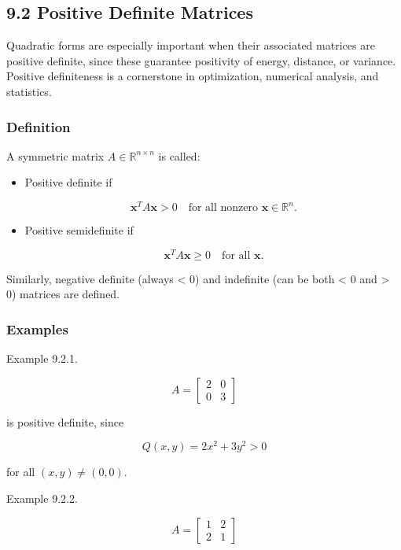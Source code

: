 \documentclass[
  12pt,
  a4paper,
]{article}
\begin{document}
\subsection{9.2 Positive Definite
Matrices}\label{92-positive-definite-matrices}

Quadratic forms are especially important when their associated matrices
are positive definite, since these guarantee positivity of energy,
distance, or variance. Positive definiteness is a cornerstone in
optimization, numerical analysis, and statistics.

\subsubsection{Definition}\label{definition-9}

A symmetric matrix \(A \in \mathbb{R}^{n \times n}\) is called:

\begin{itemize}
\item
  Positive definite if

  \[\mathbf{x}^T A \mathbf{x} > 0 \quad \text{for all nonzero } \mathbf{x} \in \mathbb{R}^n.\]
\item
  Positive semidefinite if

  \[\mathbf{x}^T A \mathbf{x} \geq 0 \quad \text{for all } \mathbf{x}.\]
\end{itemize}

Similarly, negative definite (always \textless{} 0) and indefinite (can
be both \textless{} 0 and \textgreater{} 0) matrices are defined.

\subsubsection{Examples}\label{examples-10}

Example 9.2.1.

\[A = \begin{bmatrix} 2 & 0 \\ 0 & 3 \end{bmatrix}\]

is positive definite, since

\[Q(x,y) = 2x^2 + 3y^2 > 0\]

for all \((x,y) \neq (0,0)\).

Example 9.2.2.

\[A = \begin{bmatrix} 1 & 2 \\ 2 & 1 \end{bmatrix}\]
\end{document}
